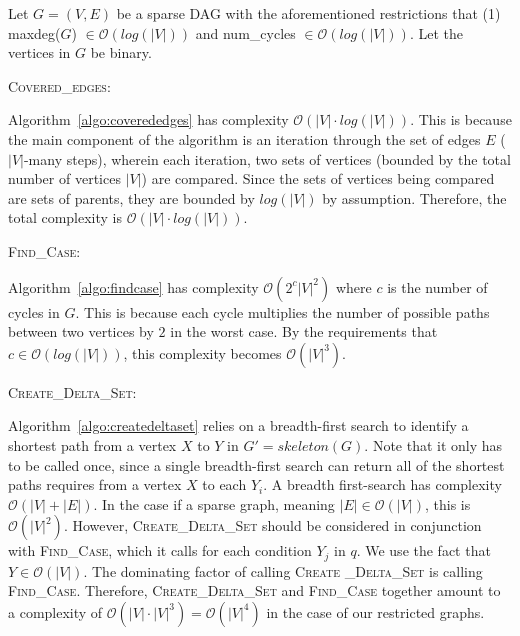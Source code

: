 \null \quad \quad Let $G = (V,E)$ be a sparse DAG with the aforementioned restrictions that (1) maxdeg($G$) $\in \mathcal{O}(log(|V|))$ and num\_cycles $\in \mathcal{O}(log(|V|))$. Let the vertices in $G$ be binary. \newline

\textsc{Covered\_edges:}
\begin{myindentpar}{1.5em} Algorithm~\ref{algo:coverededges} has complexity $\mathcal{O}(|V| \cdot log(|V|))$. This is because the main component of the algorithm is an iteration through the set of edges $E$ ($|V|$-many steps), wherein each iteration, two sets of vertices (bounded by the total number of vertices $|V|$) are compared. Since the sets of vertices being compared are sets of parents, they are bounded by $log(|V|)$ by assumption. Therefore, the total complexity is $\mathcal{O}(|V| \cdot log(|V|))$. \newline
\end{myindentpar}

\textsc{Find\_Case:} 
\begin{myindentpar}{1.5em}Algorithm~\ref{algo:findcase} has complexity $\mathcal{O}(2^{c}|V|^{2})$ where $c$ is the number of cycles in $G$. This is because each cycle multiplies the number of possible paths between two vertices by $2$ in the worst case.  By the requirements that $c \in \mathcal{O}(log(|V|))$, this complexity becomes $\mathcal{O}(|V|^{3})$. \newline 
\end{myindentpar}

\textsc{Create\_Delta\_Set:} 
\begin{myindentpar}{1.5em} Algorithm~\ref{algo:createdeltaset} relies on a breadth-first search to identify a shortest path from a vertex $X$ to $Y$ in $G' = skeleton(G)$. Note that it only has to be called once, since a single breadth-first search can return all of the shortest paths requires from a vertex $X$ to each $Y_{i}$. A breadth first-search has complexity $\mathcal{O}(|V|+|E|)$. In the case if a sparse graph, meaning $|E| \in \mathcal{O}(|V|)$, this is $\mathcal{O}(|V|^{2})$. However, \textsc{Create\_Delta\_Set} should be considered in conjunction with \textsc{Find\_Case}, which it calls for each condition $Y_{j}$ in $q$. We use the fact that $Y \in \mathcal{O}(|V|)$. The dominating factor of calling \textsc{Create \_Delta\_Set} is calling \textsc{Find\_Case}. Therefore, \textsc{Create\_Delta\_Set} and \textsc{Find\_Case} together amount to a complexity of $\mathcal{O}(|V| \cdot |V|^{3}) = \mathcal{O}(|V|^{4})$ in the case of our restricted graphs. \newline
\end{myindentpar}

